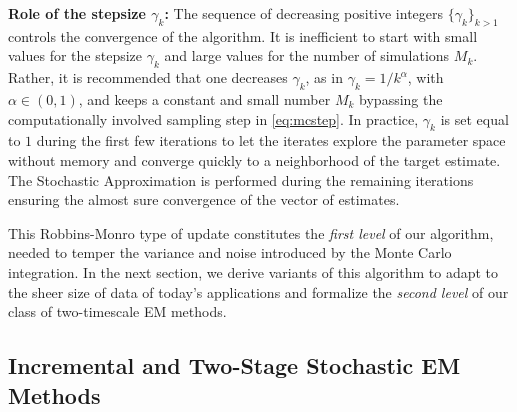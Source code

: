 \documentclass[11pt]{article}
\theoremstyle{t}
\begin{document}
\textbf{Role of the stepsize $\gamma_k$:}  The sequence of decreasing positive integers $\{ \gamma_{k} \}_{k>1}$ controls the convergence of the algorithm.
It is inefficient to start with small values for the stepsize $\gamma_k$ and large values for the number of simulations $M_k$. 
Rather, it is recommended that one decreases $\gamma_k$, as in $\gamma_k = 1/k^\alpha$, with $\alpha \in (0,1)$, and keeps a constant and small number $M_k$ bypassing the computationally involved sampling step in \eqref{eq:mcstep}.
 In practice, $\gamma_k$ is set equal to $1$ during the first few iterations to let the iterates explore the parameter space without memory and converge quickly to a neighborhood of the target estimate. 
 The Stochastic Approximation is performed during the remaining iterations ensuring the almost sure convergence of the vector of estimates.

This Robbins-Monro type of update constitutes the \textit{first level} of our algorithm, needed to temper the variance and noise introduced by the Monte Carlo integration.
In the next section, we derive variants of this algorithm to adapt to the sheer size of data of today's applications and formalize the \textit{second level} of our class of two-timescale EM methods.

\vspace{-0.05in}
\subsection{Incremental and Two-Stage Stochastic EM Methods} \label{sec:sEM}
\vspace{-0.05in}
\end{document}
